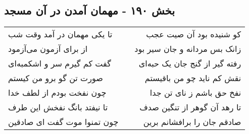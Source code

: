 \begin{center}
\section*{بخش ۱۹۰ - مهمان آمدن در آن مسجد}
\label{sec:sh190}
\begin{longtable}{l p{0.5cm} r}
تا یکی مهمان در آمد وقت شب
&&
کو شنیده بود آن صیت عجب
\\
از برای آزمون می‌آزمود
&&
زانک بس مردانه و جان سیر بود
\\
گفت کم گیرم سر و اشکمبه‌ای
&&
رفته گیر از گنج جان یک حبه‌ای
\\
صورت تن گو برو من کیستم
&&
نقش کم ناید چو من باقیستم
\\
چون نفخت بودم از لطف خدا
&&
نفخ حق باشم ز نای تن جدا
\\
تا نیفتد بانگ نفخش این طرف
&&
تا رهد آن گوهر از تنگین صدف
\\
چون تمنوا موت گفت ای صادقین
&&
صادقم جان را برافشانم برین
\\
\end{longtable}
\end{center}
